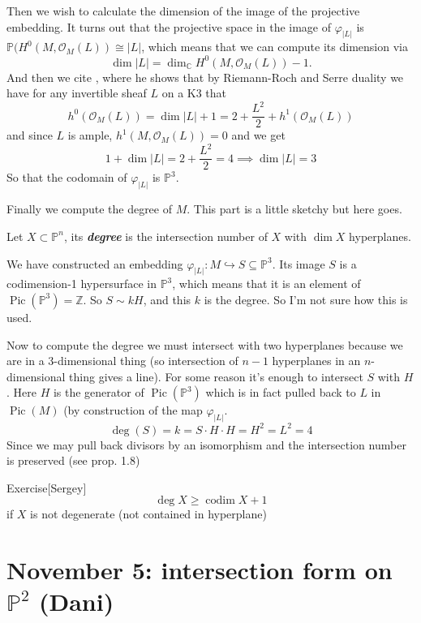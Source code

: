 Then we wish to calculate the dimension of the image of the projective embedding. It turns out that the projective space in the image of $\varphi_{|L|}$ is $\mathbb{P}(H^{0}(M,\mathcal{O}_M(L))\cong |L|$, which means that we can compute its dimension via
\[\dim |L| =\dim_{\mathbb{C}}H^{0}(M,\mathcal{O}_M(L))-1.\]
And then we cite \cite{saint-donat}, where he shows that by Riemann-Roch and Serre duality we have for any invertible sheaf $L$ on a K3 that
\[h^{0}(\mathcal{O}_M(L))=\dim |L| +1=2+\frac{L^2}{2}+h^{1}(\mathcal{O}_M(L))\]
and since $L$ is ample, $h^{1}(M,\mathcal{O}_M(L))=0$ and we get 
\[1+\dim |L| =2+\frac{L^2}{2}=4\implies \dim |L| =3\]
So that the codomain of $\varphi_{|L|}$ is $\mathbb{P}^{3}$.

Finally we compute the degree of $M$. {\color{6}This part is a little sketchy} but here goes.

\begin{defn}\leavevmode
	Let $X\subset \mathbb{P}^n$, its \textit{\textbf{degree}} is the intersection number of $X$ with $\dim X$ hyperplanes.
\end{defn}

We have constructed an embedding $\varphi_{|L|}:M\hookrightarrow S\subseteq \mathbb{P}^3$. Its image $S$ is a codimension-1 hypersurface in $\mathbb{P}^3$, which means that it is an element  of  $\operatorname{Pic}(\mathbb{P}^3) =\mathbb{Z}$. So $S \sim kH$, and this $k$ is the degree. {\color{6}So I'm not sure how this is used.}

Now to compute the degree we must intersect with two hyperplanes because we are in a 3-dimensional thing (so intersection of $n-1$ hyperplanes in an  $ n$-dimensional thing gives a line). {\color{6}For some reason} it's enough to intersect $S$ with $H$. Here $H$ is the generator of $\operatorname{Pic}(\mathbb{P}^3)$ which is in fact pulled back to $L$ in $\operatorname{Pic}(M)$ (by construction of the map $\varphi_{|L|}$.
\[\operatorname{deg}(S)=k=S\cdot H\cdot H=H^2=L^2=4\]
Since we may pull back divisors by an isomorphism and the intersection number is preserved (see \cite{beauville} prop. 1.8)

\begin{thing5}{Exercise}[Sergey]\leavevmode
	\[\operatorname{deg}X\geq \operatorname{codim}X+1\]
	if $X$ is not degenerate (not contained in hyperplane)
\end{thing5}

\section{November 5: intersection form on $\mathbb{P}^2$ (Dani)}

